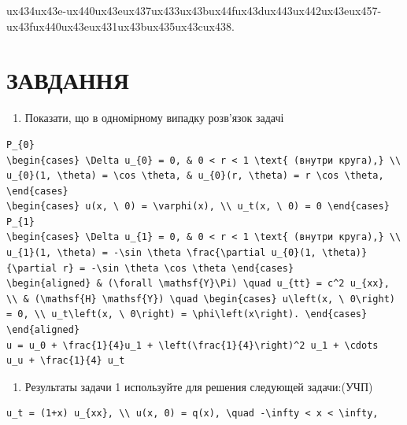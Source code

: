 \documentclass[
  ukrainian,
]{article}
\providecommand{\tightlist}{%
  \setlength{\itemsep}{0pt}\setlength{\parskip}{0pt}}
\begin{document}
{ux434ux43e-ux440ux43eux437ux433ux43bux44fux43dux443ux442ux43eux457-ux43fux440ux43eux431ux43bux435ux43cux438.}

\section{ЗАВДАННЯ}\label{ux437ux430ux432ux434ux430ux43dux43dux44f-1}

\begin{enumerate}
\def\labelenumi{\arabic{enumi}.}
\tightlist
\item
  Показати, що в одномірному випадку розв'язок задачі
\end{enumerate}

\begin{verbatim}
P_{0}
\begin{cases} \Delta u_{0} = 0, & 0 < r < 1 \text{ (внутри круга),} \\ u_{0}(1, \theta) = \cos \theta, & u_{0}(r, \theta) = r \cos \theta, \end{cases}
\begin{cases} u(x, \ 0) = \varphi(x), \\ u_t(x, \ 0) = 0 \end{cases}
P_{1}
\begin{cases} \Delta u_{1} = 0, & 0 < r < 1 \text{ (внутри круга),} \\ u_{1}(1, \theta) = -\sin \theta \frac{\partial u_{0}(1, \theta)}{\partial r} = -\sin \theta \cos \theta \end{cases}
\begin{aligned} & (\forall \mathsf{Y}\Pi) \quad u_{tt} = c^2 u_{xx}, \\ & (\mathsf{H} \mathsf{Y}) \quad \begin{cases} u\left(x, \ 0\right) = 0, \\ u_t\left(x, \ 0\right) = \phi\left(x\right). \end{cases} \end{aligned}
u = u_0 + \frac{1}{4}u_1 + \left(\frac{1}{4}\right)^2 u_1 + \cdots
u_u + \frac{1}{4} u_t
\end{verbatim}

\begin{enumerate}
\def\labelenumi{\arabic{enumi}.}
\setcounter{enumi}{1}
\tightlist
\item
  Результаты задачи 1 используйте для решения следующей задачи:(УЧП)
\end{enumerate}

\begin{verbatim}
u_t = (1+x) u_{xx}, \\ u(x, 0) = q(x), \quad -\infty < x < \infty,
\end{verbatim}
\end{document}
